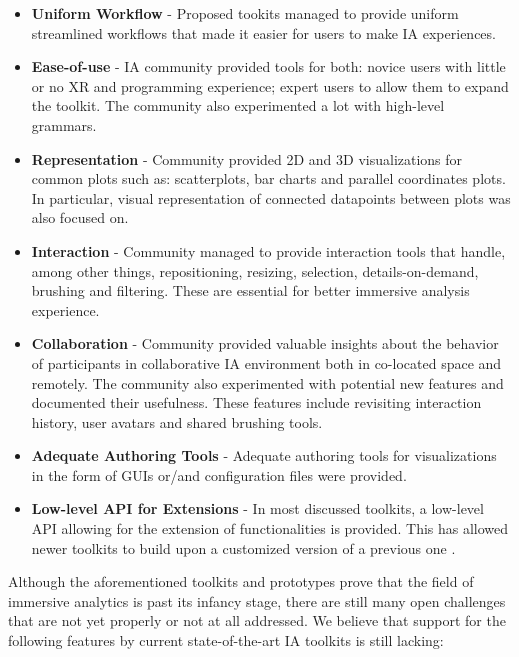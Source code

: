 \documentclass{vgtc}                          %
\begin{document}
\begin{itemize}
	\item \textbf{Uniform Workflow} - Proposed tookits managed to provide
	      uniform streamlined workflows that made it easier for users to make
	      IA experiences.
	\item \textbf{Ease-of-use} - IA community provided tools for both: novice
	      users with little or no XR and programming experience; expert users
	      to allow them to expand the toolkit. The community also experimented
	      a lot with high-level grammars.
	\item \textbf{Representation} - Community provided 2D and 3D visualizations
	      for common plots such as: scatterplots, bar charts and parallel
	      coordinates plots. In particular, visual representation of connected
	      datapoints between plots was also focused on.
	\item \textbf{Interaction} - Community managed to provide interaction tools
	      that handle, among other things, repositioning, resizing, selection,
	      details-on-demand, brushing and filtering. These are essential for
	      better immersive analysis experience.
	\item \textbf{Collaboration} - Community provided valuable insights about
	      the behavior of participants in collaborative IA environment both
	      in co-located space and remotely. The community also experimented
	      with potential new features and documented their usefulness. These
	      features include revisiting interaction history, user avatars and
	      shared brushing tools.
	\item \textbf{Adequate Authoring Tools} - Adequate authoring tools for
	      visualizations in the form of GUIs or/and configuration files were
	      provided.
	\item \textbf{Low-level API for Extensions} - In most discussed toolkits,
	      a low-level API allowing for the extension of functionalities is
	      provided. This has allowed newer toolkits to build upon a
	      customized version of a previous one \cite{ragrug_toolkit}.
\end{itemize}

\noindent Although the aforementioned toolkits and prototypes prove that the
field of immersive analytics is past its infancy stage, there are still many
open challenges that are not yet properly or not at all addressed. We believe
that support for the following features by current state-of-the-art IA toolkits
is still lacking:
\end{document}
